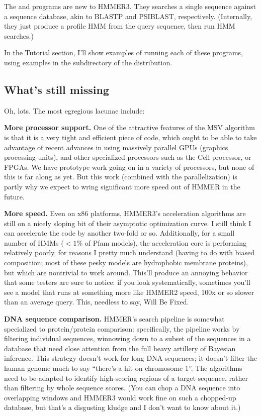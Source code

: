 The  and  programs are new to
HMMER3. They searches a single sequence against a sequence database,
akin to BLASTP and PSIBLAST, respectively. (Internally, they just
produce a profile HMM from the query sequence, then run HMM searches.)

In the Tutorial section, I'll show examples of running each of these
programs, using examples in the  subdirectory of the
distribution.


\subsection{What's still missing}

Oh, lots. The most egregious lacunae include:

\textbf{More processor support.} One of the attractive features of the
MSV algorithm is that it is a very tight and efficient piece of code,
which ought to be able to take advantage of recent advances in using
massively parallel GPUs (graphics processing units), and other
specialized processors such as the Cell processor, or FPGAs. We have
prototype work going on in a variety of processors, but none of this
is far along as yet. But this work (combined with the parallelization)
is partly why we expect to wring significant more speed out of HMMER
in the future.

\textbf{More speed.} Even on x86 platforms, HMMER3's acceleration
algorithms are still on a nicely sloping bit of their asymptotic
optimization curve. I still think I can accelerate the code by another
two-fold or so. Additionally, for a small number of HMMs ($<1$\% of
Pfam models), the acceleration core is performing relatively poorly,
for reasons I pretty much understand (having to do with biased
composition; most of these pesky models are hydrophobic membrane
proteins), but which are nontrivial to work around. This'll produce an
annoying behavior that some testers are sure to notice: if you look
systematically, sometimes you'll see a model that runs at something
more like HMMER2 speed, 100x or so slower than an average query. This,
needless to say, Will Be Fixed.

\textbf{DNA sequence comparison.} HMMER's search pipeline is somewhat
specialized to protein/protein comparison: specifically, the pipeline
works by filtering individual sequences, winnowing down to a subset of
the sequences in a database that need close attention from the full
heavy artillery of Bayesian inference. This strategy doesn't work for
long DNA sequences; it doesn't filter the human genome much to say
``there's a hit on chromosome 1''. The algorithms need to be adapted
to identify high-scoring regions of a target sequence, rather than
filtering by whole sequence scores. (You can chop a DNA sequence into
overlapping windows and HMMER3 would work fine on such a chopped-up
database, but that's a disgusting kludge and I don't want to know
about it.)

